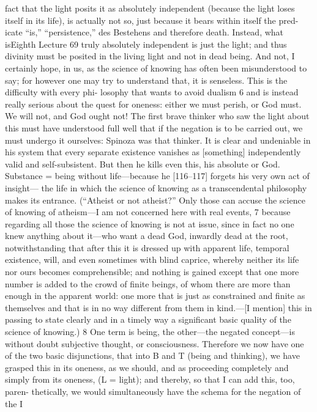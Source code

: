 fact that the light posits it as absolutely independent (because the light loses
itself in its life), is actually not so, just because it bears within itself the pred-
icate “is,” “persistence,” {des Bestehens} and therefore death. Instead, what isEighth Lecture
69
truly absolutely independent is just the light; and thus divinity must be posited
in the living light and not in dead being. And not, I certainly hope, in us, as
the science of knowing has often been misunderstood to say; for however one
may try to understand that, it is senseless. This is the difficulty with every phi-
losophy that wants to avoid dualism 6 and is instead really serious about the
quest for oneness: either we must perish, or God must. We will not, and God
ought not! The first brave thinker who saw the light about this must have
understood full well that if the negation is to be carried out, we must undergo
it ourselves: Spinoza was that thinker. It is clear and undeniable in his system
that every separate existence vanishes as [something] independently valid and
self-subsistent. But then he kills even this, his absolute or God. Substance =
being without life—because he [116–117] forgets his very own act of insight—
the life in which the science of knowing as a transcendental philosophy makes
its entrance. (“Atheist or not atheist?” Only those can accuse the science of
knowing of atheism—I am not concerned here with real events, 7 because
regarding all those the science of knowing is not at issue, since in fact no one
knew anything about it—who want a dead God, inwardly dead at the root,
notwithstanding that after this it is dressed up with apparent life, temporal
existence, will, and even sometimes with blind caprice, whereby neither its life
nor ours becomes comprehensible; and nothing is gained except that one more
number is added to the crowd of finite beings, of whom there are more than
enough in the apparent world: one more that is just as constrained and finite
as themselves and that is in no way different from them in kind.—[I mention]
this in passing to state clearly and in a timely way a significant basic quality of
the science of knowing.) 8
One term is being, the other—the negated concept—is without doubt
subjective thought, or consciousness. Therefore we now have one of the two
basic disjunctions, that into B and T (being and thinking), we have grasped
this in its oneness, as we should, and as proceeding completely and simply
from its oneness, (L = light); and thereby, so that I can add this, too, paren-
thetically, we would simultaneously have the schema for the negation of the I
